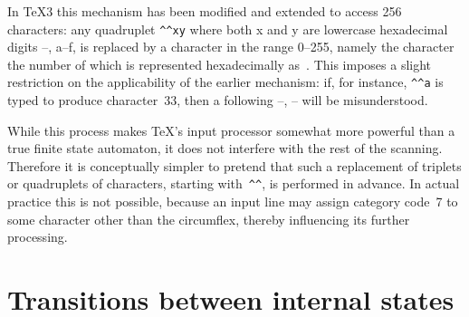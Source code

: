 \documentclass{book}
\begin{document}
In \TeX3 this mechanism has been 
modified and extended to access 256 characters:
any quadruplet \verb-^^xy- where both \n x and \n y are lowercase
hexadecimal digits --, \n a--\n f, 
is replaced by a character in the
range 0--255, namely the character the number of which is
represented hexadecimally as~.
This imposes a slight restriction on the applicability
of the earlier mechanism: if, for instance, \verb>^^a>
is typed to produce character~33, then a following
--, -- will be misunderstood.

While this process makes \TeX's input processor
somewhat more powerful
than a true finite state automaton,
it does not interfere with the rest of
the scanning. Therefore it is conceptually simpler to pretend that
such a replacement of triplets or quadruplets
of characters, starting with~\verb>^^>, is performed in advance. 
In actual practice this is not possible,
because an
input line may assign category code~7 to some 
character other than the circumflex, thereby 
influencing its further processing.


\section{Transitions between internal states}
\end{document}
